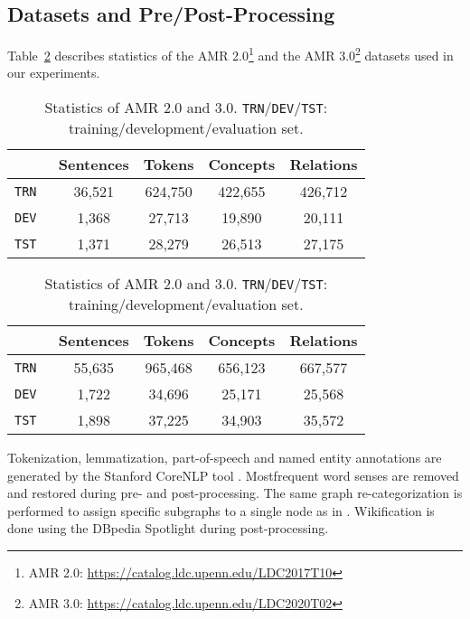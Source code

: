 \documentclass[11pt,a4paper]{article}
\newcommand{\LN}{\linebreak\noindent}    \newcommand{\textsec}[1]{\textsection\ref{#1}}
\begin{document}
\subsection{Datasets and Pre/Post-Processing}
\label{app:environmental-setup}

Table~\ref{tab:data-stats} describes statistics of the AMR 2.0\footnote{AMR 2.0: \url{https://catalog.ldc.upenn.edu/LDC2017T10}} and the AMR 3.0\footnote{AMR 3.0: \url{https://catalog.ldc.upenn.edu/LDC2020T02}} datasets used in our experiments.


\begin{table}[h]
    \begin{subtable}[h]{0.45\textwidth}
    	\small
        \centering
\begin{tabular}{c||c|c|c|c} 
  & \bf Sentences & \bf Tokens & \bf Concepts & \bf Relations \\
\hline\hline
\tt TRN & 36,521 & 624,750 & 422,655 & 426,712 \\
\tt DEV & 1,368 & 27,713 & 19,890 & 20,111 \\
\tt TST & 1,371 & 28,279 & 26,513 & 27,175 \\
\end{tabular}
       \caption{AMR 2.0.}
       \label{tab:amr2_stat}
    \end{subtable}
    \hfill
    \begin{subtable}[h]{0.45\textwidth}
    	\small
        \centering
\begin{tabular}{c||c|c|c|c} 
  & \bf Sentences & \bf Tokens & \bf Concepts & \bf Relations \\
\hline\hline
\tt TRN & 55,635 & 965,468 & 656,123 & 667,577 \\
\tt DEV & 1,722 & 34,696 & 25,171 & 25,568 \\
\tt TST & 1,898 & 37,225 & 34,903 & 35,572 \\
\end{tabular}
        \caption{AMR 3.0.}
        \label{tab:amr3_stat}
     \end{subtable}
\caption{Statistics of AMR 2.0 and 3.0. \texttt{TRN}/\texttt{DEV}/\texttt{TST}: training/development/evaluation set.}
\label{tab:data-stats}
\end{table}



\noindent Tokenization, lemmatization, part-of-speech and named entity annotations are generated by the Stanford CoreNLP tool \cite{manning2014stanford}.
Most\LN frequent word senses are removed and restored during pre- and post-processing.
The same graph re-categorization is performed to assign specific subgraphs to a single node as in \citet{cai-lam-2020-amr}. Wikification is done using the DBpedia Spotlight \cite{isem2013daiber} during post-processing.
\end{document}
